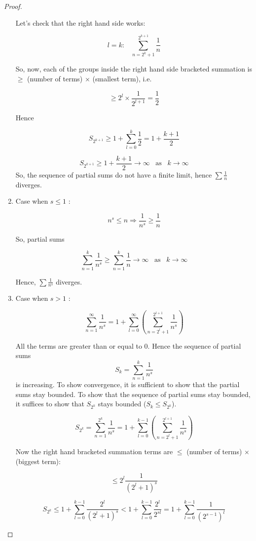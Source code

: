 \documentclass[12pt]{scrbook}
\begin{document}
\begin{proof}
\begin{enumerate}
Let's check that the right hand side works:

\[ l = k: \;\;\; \sum_{n=2^k + 1}^{2^{k+1}} \frac{1}{n}  \]

So, now, each of the groups inside the right hand side bracketed summation is $\ge$ (number of terms) $\times$ (smallest term), i.e. 

\[ \ge 2^l \times \frac{1}{2^{l+1}}  = \frac{1}{2} \]

Hence

\[ S_{2^{k+1}} \ge 1 + \sum_{l=0}^{k} \frac{1}{2}  = 1 + \frac{k+1}{2} \]

\[ S_{2^{k+1}} \ge 1 + \frac{k+1}{2} \rightarrow \infty \;\;\; \text{as} \;\;\; k \rightarrow \infty \]
So, the sequence of partial sums do not have a finite limit, hence $\sum \frac{1}{n} $ diverges.

\item Case when $s \le 1$ :

\[ n^s \le n \Rightarrow \frac{1}{n^s} \ge \frac{1}{n} \]

So, partial sums

\[\sum_{n=1}^{k} \frac{1}{n^s} \ge \sum_{n=1}^{k} \frac{1}{n} \rightarrow \infty \;\;\; \text{as} \;\;\; k \rightarrow \infty \]

Hence, $\sum \frac{1}{n^s}$ diverges.

\item Case when $s > 1$ :

\[ \sum_{n=1}^{\infty} \frac{1}{n^s} = 1 + \sum_{l=0}^{\infty} \left( \sum_{n=2^{l} + 1}^{2^{l+1}} \frac{1}{n^s} \right) \]

All the terms are greater than or equal to 0.  Hence the sequence of partial sums
\[ S_k = \sum_{n=1}^{k} \frac{1}{n^s} \] 
is increasing. To show convergence, it is sufficient to show that the partial sums stay bounded.  To show that the sequence of partial sums stay bounded, it suffices to show that $ S_{2^k} $ stays bounded  ($ S_k \le S_{2^k} $).

\[ S_{2^k} = \sum_{n=1}^{2^k} \frac{1}{n^s}  = 1 + \sum_{l=0}^{k-1} \left( \sum_{n=2^{l} + 1}^{2^{l+1}} \frac{1}{n^s} \right) \]

Now the right hand bracketed summation terms are $ \le $ (number of terms) $\times$ (biggest term):

\[ \le 2^l \frac{1}{(2^l + 1)^s} \]

\[ S_{2^k} \le 1 +\sum_{l=0}^{k-1} \frac{2^l}{(2^l + 1)^s} < 1 +  \sum_{l=0}^{k-1} \frac{2^l}{2^{sl}} 
= 1 +  \sum_{l=0}^{k-1} \frac{1}{(2^{s-1})^l}  \]


\end{enumerate}
\end{proof}
\end{document}
